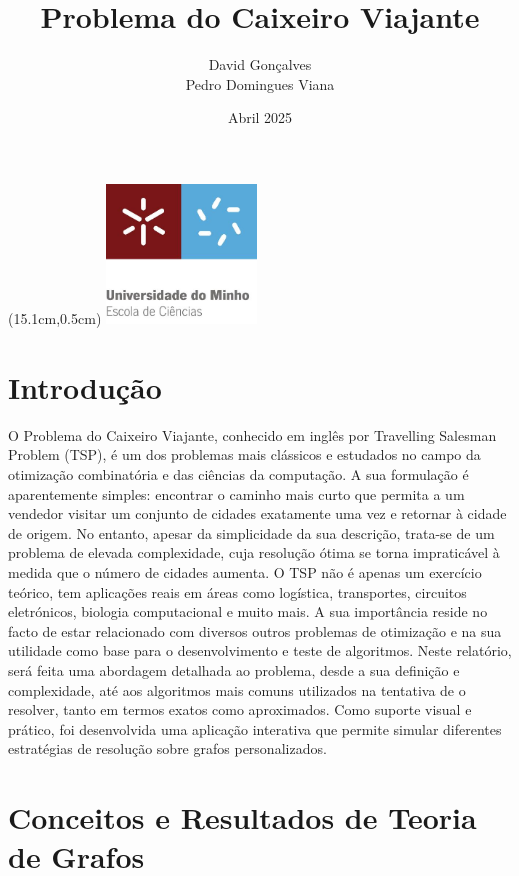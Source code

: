 \documentclass{article}
\title{Problema do Caixeiro Viajante}
\author{David Gonçalves \\ Pedro Domingues Viana}
\date{Abril 2025}
\begin{document}
\begin{textblock*}{2cm}(15.1cm,0.5cm) %
\includegraphics[width=4cm]{ImagemEvento.ashx.jpeg}
\end{textblock*}
\maketitle
\newpage
\tableofcontents
\newpage

\section{Introdução}
O Problema do Caixeiro Viajante, conhecido em inglês por Travelling Salesman Problem (TSP), é um dos problemas mais clássicos e estudados no campo da otimização combinatória e das ciências da computação. A sua formulação é aparentemente simples: encontrar o caminho mais curto que permita a um vendedor visitar um conjunto de cidades exatamente uma vez e retornar à cidade de origem. No entanto, apesar da simplicidade da sua descrição, trata-se de um problema de elevada complexidade, cuja resolução ótima se torna impraticável à medida que o número de cidades aumenta.
O TSP não é apenas um exercício teórico, tem aplicações reais em áreas como logística, transportes, circuitos eletrónicos, biologia computacional e muito mais. A sua importância reside no facto de estar relacionado com diversos outros problemas de otimização e na sua utilidade como base para o desenvolvimento e teste de algoritmos.
Neste relatório, será feita uma abordagem detalhada ao problema, desde a sua definição e complexidade, até aos algoritmos mais comuns utilizados na tentativa de o resolver, tanto em termos exatos como aproximados. Como suporte visual e prático, foi desenvolvida uma aplicação interativa que permite simular diferentes estratégias de resolução sobre grafos personalizados.

\newpage

\section{Conceitos e Resultados de Teoria de Grafos}
\end{document}
